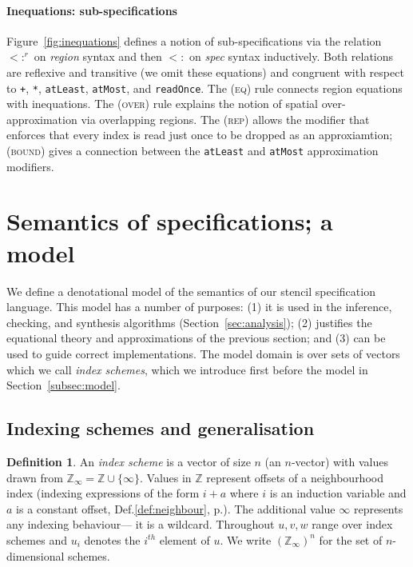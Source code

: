 \documentclass[9pt]{sigplanconf}
\newcounter{block}
\theoremstyle{definition}
\newtheorem{definition}[block]{Definition}
\newcommand{\term}[1]{\texttt{#1}}
\newcommand{\trule}[1]{{\footnotesize{#1}}}
\begin{document}
\paragraph{Inequations: sub-specifications}

Figure~\ref{fig:inequations} defines a notion of sub-specifications
via the relation $<:^r$ on \textit{region}
syntax and then $<:$ on \textit{spec} syntax inductively.
Both relations are reflexive and transitive (we omit
these equations) and congruent
with respect to \term{+}, \term{*}, \term{atLeast}, \term{atMost},
and \term{readOnce}. The (\trule{\textsc{eq}}) rule connects region
equations with inequations. The (\trule{\textsc{over}}) rule explains
the notion of spatial over-approximation via overlapping regions.
The (\trule{\textsc{rep}}) allows the modifier that
enforces that every index is read just once to be dropped
as an approxiamtion; (\trule{\textsc{bound}}) gives
a connection between the \term{atLeast} and \term{atMost}
approximation modifiers.

\section{Semantics of specifications; a model}
\label{sec:semantics}

\newcommand{\domainVal}{\mathbb{Z}_\infty}

We define a denotational model of the semantics of our 
stencil specification language. This model has a number of purposes: (1) it is used in the inference,
checking, and synthesis algorithms (Section~\ref{sec:analysis}); (2)
justifies the equational
theory and approximations of the previous section; and (3) can be used
to guide correct implementations. The model domain is over sets of vectors which we call \emph{index
  schemes}, which we introduce first before the model in Section~\ref{subsec:model}.

\subsection{Indexing schemes and generalisation}
\label{subsec:schemes-and-gen}

\begin{definition}
An \emph{index scheme} is a vector of size $n$ (an $n$-vector)
with values drawn from $\domainVal = \mathbb{Z} \cup \{\infty\}$.
Values in $\mathbb{Z}$ represent offsets
of a neighbourhood index (indexing
expressions of the form $i + a$ where $i$ is an induction variable
and $a$ is a constant offset, Def.\ref{def:neighbour},
p.\pageref{def:neighbour}). The additional value
$\infty$ represents any indexing behaviour--- it is a
wildcard.
Throughout $u, v, w$ range over index schemes and $u_i$ denotes
the $i^{th}$ element of $u$. We write $(\domainVal)^n$ for
the set of $n$-dimensional schemes.
\end{definition}
\end{document}
